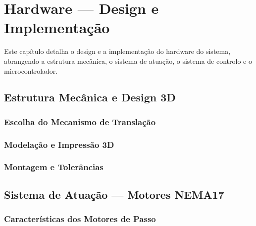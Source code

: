 

\chapter{Hardware --- Design e Implementação}
\label{chapter:hardware}

\begin{introduction}
Este capítulo detalha o design e a implementação do hardware do sistema, abrangendo a estrutura mecânica, o sistema de atuação, o sistema de controlo e o microcontrolador.
\end{introduction}



\section{Estrutura Mecânica e Design 3D}
\label{sec:estrutura-mecanica}


\subsection{Escolha do Mecanismo de Translação}
\label{subsec:mecanismo-translacao}


\subsection{Modelação e Impressão 3D}
\label{subsec:modelacao-3d}


\subsection{Montagem e Tolerâncias}
\label{subsec:montagem-tolerancias}



\section{Sistema de Atuação --- Motores NEMA17}
\label{sec:sistema-atuacao}


\subsection{Características dos Motores de Passo}
\label{subsec:caracteristicas-motores}

